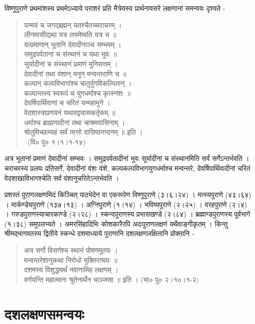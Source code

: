 विष्णुपुराणे प्रथमांशस्य प्रथमेऽध्याये पराशरं प्रति मैत्रेयस्य प्रार्थनावसरे लक्षणानां समन्वयः दृश्यते -
\begin{verse}
यन्मयं च जगद्ब्रह्मन् यतश्चैतच्चराचरम् ।\\
लीनमासीद्यथा यत्र लयमेष्यति यत्र च ॥\\
यत्प्रमाणान् भूतानि देवादीनाञ्च सम्भवम् ।\\
समुद्रपर्वतानां च संस्थानं च यथा भुवः ॥\\
सूर्यादीनां च संस्थानं प्रमाणं मुनिसत्तम् ।\\
देवादीनां तथा वंशान् मनून् मन्वन्तराणि च ॥\\
कल्पान् कल्पविभागांश्च चातुर्युगविकल्पितान् ।\\
कल्पान्तस्य स्वरूपं च युगधर्माश्च कृत्स्नशः ॥\\
देवर्षिपार्थिवानां च चरितं यन्महामुने ।\\
वेदशास्त्राप्रणयनं यथावद्व्यासकर्तृकम् ॥\\
धर्माश्च ब्राह्मणादीनां तथा चाश्रमवासिनाम् ।\\
श्रोतुमिच्छाम्यहं सर्वं त्वत्तो वासिष्ठनन्दनम् ॥ इति ।\\
~\hfill(वि० पु० १।१।१-१४)
\end{verse}
अत्र भूतानां प्रमाणं देवादीनां सम्भवः । समुद्रपर्वतादीनां भुवः सूर्यादीनां च संस्थानमिति सर्वं सर्गेऽन्तर्भवति । चराचरस्य प्रलयः प्रतिसर्गे, देवादीनां वंशः वंशे, कल्पकल्पविभागयुगधर्माश्च मन्वन्तरे, देवर्षिपार्थिवादीनां चरितं वेदशाखाविभागश्चेति सर्वं वंशानुचरितेऽन्तर्भवति ।

प्रशस्तं पुराणलक्षणमिदं किञ्चित् पाठभेदेन वा एकरूपेण विष्णुपुराणे (३।६।२४) । मत्स्यपुराणे (४३।६४) । मार्कण्डेयपुराणे (१३७।१३) । अग्निपुराणे (१।१४) । भविष्यपुराणे (२।२५) । वरहपुराणे (२।४) । गरुडपुराणस्याचारकाण्डे (२।२८) । स्कन्दपुराणस्य प्रभासखण्डे (२।८४) । ब्रह्माण्डपुराणस्य पूर्वभागे (१।३८) समुपलभ्यते । अमरसिंहादिभिः कोशकारैरपि अदःपुराणलक्षणं यथैवाङ्गीकृतम् । किन्तु श्रीमद्भागवतस्य द्वितीये स्कन्धे दशमाध्याये पुराणानि दशलक्षणलक्षितानि प्रोक्तानि -
\begin{verse}
अत्र सर्गो विसर्गश्च स्थानं पोषणमूतयः ।\\
मन्वन्तरेशानुकथा निरोधो मुक्तिराश्रयः ॥\\
दशमस्य विशुद्ध्यर्थं नवानामिह लक्षणम् ।\\
वर्णयन्ति महात्मानः श्रुतेनार्थेन चाञ्जसा ॥ इति । (भा० पु० २।१०।१-२)
\end{verse}

\section*{दशलक्षणसमन्वयः}

